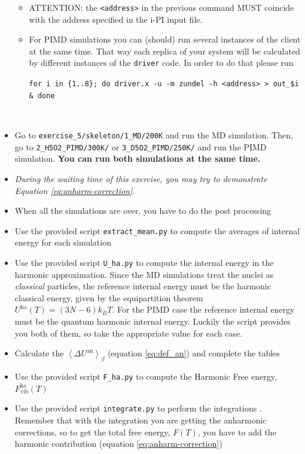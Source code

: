 \documentclass[a4paper,11pt]{scrartcl}
\begin{document}
\begin{itemize}
{{\begin{minipage}[r]{0.95\textwidth}
\begin{center}
\begin{itemize}
\item ATTENTION: the \texttt{<address>} in the previous command MUST coincide\\
with the address specified in the i-PI input file. 

\item For PIMD simulations you can (should) run several instances of the client at the same time. That way each replica of your system will be calculated by different instances of the \texttt{driver} code. In order to do that please run 

\texttt{for i in \{1..8\}; do driver.x -u -m zundel -h <address> > out\_\$i \&   done}

\texttt{ }

\end{itemize}
\vspace{0.3cm}
\end{center}
\end{minipage}}}

\item{Go to \texttt{exercise\_5/skeleton/1\_MD/200K} and run the MD simulation. Then, go to \texttt{2\_H5O2\_PIMD/300K/} or \texttt{3\_D5O2\_PIMD/250K/} and run the PIMD simulation. 
\textbf{You can run both simulations at the same time.}}
\item{{\em During the waiting time of this exercise, you may try to demonstrate Equation \ref{eq:anharm-correction}}}.
\item{When all the simulations are over, you have to do the post processing}
\item{Use the provided script \texttt{extract\_mean.py} to compute the averages of internal energy for each simulation}
\item{Use the provided script  \texttt{U\_ha.py} to compute the internal energy in the harmonic approximation. Since the MD simulations treat the nuclei as \textit{classical} particles, the reference internal energy must be the harmonic classical energy, given by the equipartition theorem $U^{\text{ha}}(T)= {(3N-6)}k_BT$. For the PIMD case the reference internal energy must be the quantum harmonic internal energy. Luckily the script provides you both of them, so take the appropriate value for each case.}
\item{Calculate the $\left\langle \Delta U^{\text{an}} \right\rangle_{\beta}$ (equation \ref{eq:def_an}) and complete the tables}
\item{ Use the provided script \texttt{F\_ha.py} to compute the Harmonic Free energy, $F^{\text{ha}}_{\text{vib}}(T)$}
\item{ Use the provided script \texttt{integrate.py} to perform the integrations . Remember that with the integration you are getting the anharmonic corrections, so to get the total free energy, $F(T)$, you have to add the harmonic contribution (equation \ref{eq:anharm-correction})}


\end{itemize}
\end{document}
